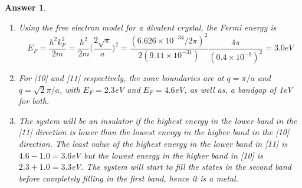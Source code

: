 \documentclass[a4paper]{article}
\newtheorem{ans}{Answer}[subsection]
\theoremstyle{new}
\begin{document}
\begin{ans}
\begin{enumerate}[label=(\alph*)]
\begin{center}
\hspace{2cm}
\end{center}
\item Using the free electron model for a divalent crystal, the Fermi energy is
$$E_F=\frac{\hbar^2k_F^2}{2m}=\frac{\hbar^2}{2m}\bigg(\frac{2\sqrt{\pi}}{a}\bigg)^2=\frac{(6.626\times10^{-34}/2\pi)^2}{2(9.11\times10^{-31})}\frac{4\pi}{(0.4\times10^{-9})^2}=3.0eV$$
\item For [10] and [11] respectively, the zone boundaries are at $q=\pi/a$ and $q=\sqrt{2}\pi/a$, with $E_F=2.3$eV and $E_F=4.6$eV, as well as, a bandgap of 1eV for both.
\item The system will be an insulator if the highest energy in the lower band in the [11] direction is lower than the lowest energy in the higher band in the [10] direction. The least value of the highest energy in the lower band in [11] is $4.6-1.0=3.6$eV but the lowest energy in the higher band in [10] is $2.3+1.0=3.3$eV. The system will start to fill the states in the second band before completely filling in the first band, hence it is a metal.
\end{enumerate}
\end{ans}
\end{document}
